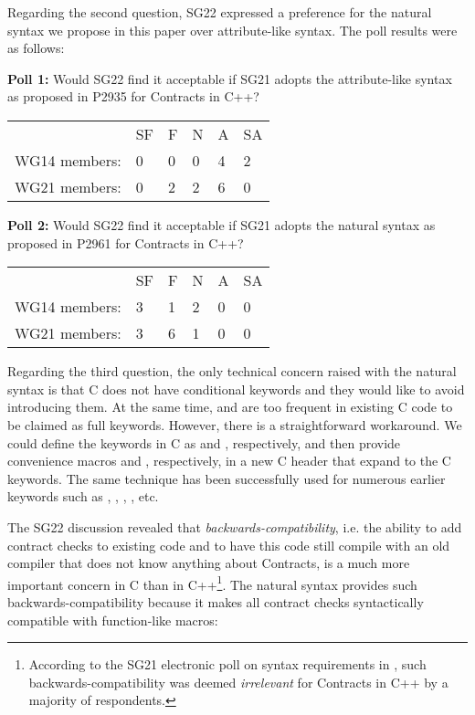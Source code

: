 Regarding the second question, SG22 expressed a preference for the natural syntax we propose in this paper over attribute-like syntax. The poll results were as follows:

\begin{adjustwidth}{0.5cm}{0.5cm}
\textbf{Poll 1:} Would SG22 find it acceptable if SG21 adopts the attribute-like syntax as proposed in P2935 for Contracts in C++?

\begin{tabular}{l lllll}
 &SF & F & N & A & SA \\
WG14 members: & 0 & 0 & 0 & 4 & 2 \\
WG21 members: & 0 & 2 & 2 & 6 & 0
\end{tabular}
\end{adjustwidth}

\begin{adjustwidth}{0.5cm}{0.5cm}
\textbf{Poll 2:} Would SG22 find it acceptable if SG21 adopts the natural syntax as proposed in P2961 for Contracts in C++?

\begin{tabular}{l lllll}
 &SF & F & N & A & SA \\
WG14 members: & 3 & 1 & 2 & 0 & 0 \\
WG21 members: & 3 & 6 & 1 & 0 & 0
\end{tabular}
\end{adjustwidth}

Regarding the third question, the only technical concern raised with the natural syntax is that C does not have conditional keywords and they would like to avoid introducing them. At the same time,  and  are too frequent in existing C code to be claimed as full keywords. However, there is a straightforward workaround. We could define the keywords in C as  and , respectively, and then provide convenience macros  and , respectively, in a new C header  that expand to the C keywords. The same technique has been successfully used for numerous earlier keywords such as , , , , etc.

The SG22 discussion revealed that \emph{backwards-compatibility}, i.e. the ability to add contract checks to existing code and to have this code still compile with an old compiler that does not know anything about Contracts, is a much more important concern in C than in C++\footnote{According to the SG21 electronic poll on syntax requirements in \cite{P2885R3}, such backwards-compatibility was deemed \emph{irrelevant} for Contracts in C++ by a majority of respondents.}. The natural syntax provides such backwards-compatibility because it makes all contract checks syntactically compatible with function-like macros:

